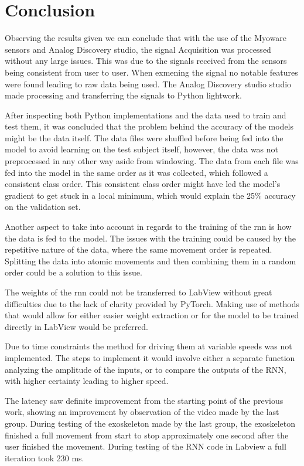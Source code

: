 \section{Conclusion}
Observing the results given we can conclude that with the use of the Myoware sensors and Analog Discovery studio, the signal 
Acquisition was processed without any large issues. This was due to the signals received from the sensors being consistent 
from user to user. When exmening the signal no notable features were found leading to raw data being used.
The Analog Discovery studio studio made processing and transferring the signals to Python lightwork.


After inspecting both Python implementations and the data used to train and test them, it was concluded that the problem behind the accuracy
of the models might be the data itself. The data files were shuffled before being fed into the model to avoid learning on the test subject
itself, however, the data was not preprocessed in any other way aside from windowing. The data from each file was fed into the model in the 
same order as it was collected, which followed a consistent class order. This consistent class order might have led the model's gradient to 
get stuck in a local minimum, which would explain the 25\% accuracy on the validation set.


Another aspect to take into account in regards to the training of the \acrshort{rnn} is how the data is fed to the model. The issues
with the training could be caused by the repetitive nature of the data, where the same movement order is repeated. Splitting the data
into atomic movements and then combining them in a random order could be a solution to this issue.


The weights of the \acrshort{rnn} could not be transferred to LabView without great difficulties due to the lack of clarity provided by
PyTorch. Making use of methods that would allow for either easier weight extraction or for the model to be trained
directly in LabView would be preferred.


Due to time constraints the method for driving them at variable speeds was not implemented. The steps to implement it
would involve either a separate function analyzing the amplitude of the inputs, or to compare the outputs of the RNN,
with higher certainty leading to higher speed.


The latency saw definite improvement from the starting point of the previous work, showing an improvement by observation of the video made by the last group. During testing of the exoskeleton made by the last group,
the exoskeleton finished a full movement from start to stop approximately one second after the user finished the movement. During testing of the RNN code in Labview a full iteration took 230 ms.



